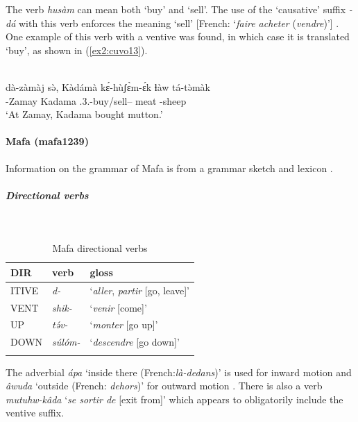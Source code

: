 The verb \textit{husàm} can mean both `buy' and `sell'. The use of the `causative' suffix \textit{-dá} with this verb enforces the meaning `sell' [French: `\textit{faire acheter} (\textit{vendre})'] \citep[315]{dadakGrammaireCuvokLangue2021}. One example of this verb with a ventive was found, in which case it is translated `buy', as shown in (\ref{ex2:cuvo13}). 

\ea\label{ex2:cuvo13}
 \\
\gll dà-zàmàj sə̀, Kàdámà kɛ́-hùʃɛ̀m-ɛ́k ɬàw tá-tə̀màk \\ 
-Zamay  Kadama .3.-buy/sell-- meat -sheep	\\
\glt `At Zamay, Kadama bought mutton.'
\z 

\paragraph*{Mafa (mafa1239)} \label{mafa}

Information on the grammar of Mafa is from a grammar sketch and lexicon \citep{barreteauLexiqueMafaLangue1990}. 

\subparagraph{Directional verbs}~

\begin{table}[H]
\caption{Mafa directional verbs} 
\label{tab:mafaV}
\begin{tabular}{lll} %
	\lsptoprule
	DIR & verb & gloss   \\ %
	\midrule
	ITIVE & \textit{d-} & `\textit{aller}, \textit{partir} [go, leave]' \\
	VENT & \textit{shik-} & `\textit{venir} [come]' \\
	UP & \textit{tə́v-} & `\textit{monter} [go up]' \\
	DOWN & \textit{súlóm-} & `\textit{descendre} [go down]' \\
	\lspbottomrule
\end{tabular}
\end{table}

The adverbial \textit{ápa} `inside there (French:\textit{là-dedans})' is used for inward motion and \textit{âwuda} `outside (French: \textit{dehors})' for outward motion \citep[78, 81]{barreteauLexiqueMafaLangue1990}. There is also a verb \textit{mutuhw-kâda} `\textit{se sortir de} [exit from]' which appears to obligatorily include the ventive suffix.

